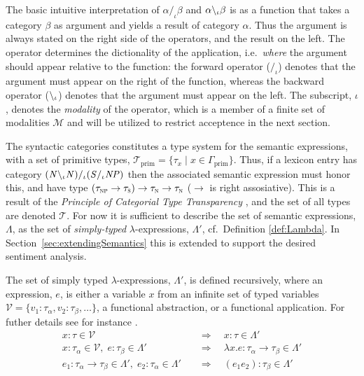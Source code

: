 The basic intuitive interpretation of $\alpha /_\iota \beta$ and $\alpha \backslash_\iota \beta$ is as a function that takes a category $\beta$ as argument and yields a result of category $\alpha$. Thus the argument is always stated on the right side of the operators, and the result on the left. The operator determines the dictionality of the application, i.e.\ \emph{where} the argument should appear relative to the function: the forward operator ($/_\iota$) denotes that the argument must appear on the right of the function, whereas the backward operator ($\backslash_\iota$) denotes that the argument must appear on the left. The subscript, $\iota$, denotes the \emph{modality} of the operator, which is a member of a finite set of modalities $\mathcal{M}$ and will be utilized to restrict acceptence in the next section. 

The syntactic categories constitutes a type system for the semantic expressions, with a set of primitive types, $\mathcal{T}_\mathrm{prim} = \{ \tau_x \; | \; x \in \Gamma_\mathrm{prim} \}$. Thus, if a lexicon entry has category $({\mathit{N}} \backslash_\iota {\mathit{N}}) /_\iota ({\mathit{S}} /_\iota {\mathit{NP}})$ then the associated semantic expression must honor this, and have type $(\tau_\textsc{np} \to \tau_\textsc{s}) \to \tau_\textsc{n} \to \tau_\textsc{n}$ ($\to$ is right assosiative). This is a result of the \emph{Principle of Categorial Type Transparency} \cite{motagueFP}, and the set of all types are denoted $\mathcal{T}$. For now it is sufficient to describe the set of semantic expressions, $\Lambda$, as the set of \emph{simply-typed} $\lambda$-expressions, $\Lambda'$, cf.\ Definition \ref{def:Lambda}. In Section~\ref{sec:extendingSemantics} this is extended to support the desired sentiment analysis.

\begin{definition}
The set of simply typed $\lambda$-expressions, $\Lambda'$, is defined recursively, where an expression, $e$, is either a variable $x$ from an infinite set of typed variables $\mathcal{V} = \{ v_1 : \tau_\alpha, v_2 : \tau_\beta, \ldots \}$, a functional abstraction, or a functional application. For futher details see for instance \cite{typedLambda}.
\begin{align}
 x : \tau \in \mathcal{V}                      &\quad \Rightarrow \quad  x  : \tau \in \Lambda' \tag{Variable} \\
 x : \tau_\alpha \in \mathcal{V}, \; e : \tau_\beta \in \Lambda'          &\quad \Rightarrow \quad  \lambda x . e : \tau_\alpha \to \tau_\beta \in \Lambda' \tag{Abstraction} \\
 e_1 : \tau_\alpha \to \tau_\beta \in \Lambda', \; e_2 : \tau_\alpha \in \Lambda'   &\quad \Rightarrow \quad  (e_1 e_2) : \tau_\beta \in \Lambda' \tag{Application} 
 \label{eq:Lambda}
\end{align}
\label{def:Lambda}
\done
\end{definition}

